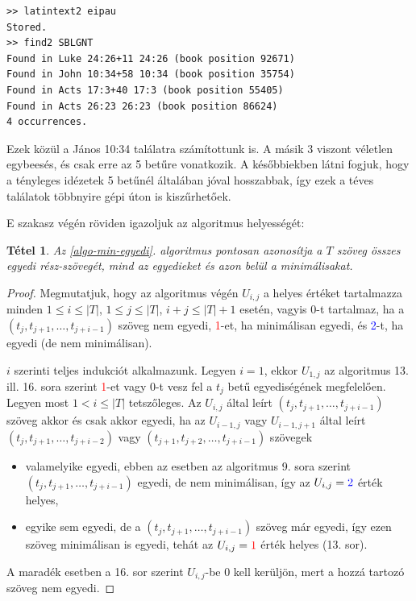 \documentclass{article}
\newtheorem{theorem}{Tétel}
\begin{document}
\begin{lstlisting}
>> latintext2 eipau
Stored.
>> find2 SBLGNT 
Found in Luke 24:26+11 24:26 (book position 92671)
Found in John 10:34+58 10:34 (book position 35754)
Found in Acts 17:3+40 17:3 (book position 55405)
Found in Acts 26:23 26:23 (book position 86624)
4 occurrences.
\end{lstlisting}

Ezek közül a János 10:34 találatra számítottunk is. A másik 3 viszont véletlen egybeesés,
és csak erre az 5 betűre vonatkozik.
A későbbiekben látni fogjuk, hogy a tényleges idézetek 5 betűnél általában jóval hosszabbak,
így ezek a téves találatok többnyire gépi úton is kiszűrhetőek.

E szakasz végén röviden igazoljuk az algoritmus helyességét:
\begin{theorem}
Az \ref{algo-min-egyedi}. algoritmus pontosan azonosítja a $T$ szöveg összes egyedi rész-szövegét,
mind az egyedieket és azon belül a minimálisakat.
\end{theorem}
\begin{proof}
Megmutatjuk, hogy az algoritmus végén $U_{i,j}$ a helyes értéket
tartalmazza minden $1\leq i\leq |T|$, $1\leq j\leq |T|$, $i+j\leq |T|+1$ esetén,
vagyis 0-t tartalmaz, ha a $(t_j,t_{j+1},\ldots,t_{j+i-1})$ szöveg nem egyedi,
\textcolor{red}{1}-et, ha minimálisan egyedi, és \textcolor{blue}{2}-t, ha egyedi (de nem minimálisan).

$i$ szerinti teljes indukciót alkalmazunk. Legyen $i=1$, ekkor $U_{1,j}$ az algoritmus
13. ill. 16. sora szerint \textcolor{red}{1}-et vagy 0-t vesz fel a $t_j$ betű egyediségének
megfelelően. Legyen most $1<i\leq |T|$ tetszőleges. Az $U_{i,j}$ által leírt
$(t_j,t_{j+1},\ldots,t_{j+i-1})$ szöveg akkor és csak akkor
egyedi, ha az $U_{i-1,j}$ vagy $U_{i-1,j+1}$ által leírt
$(t_j,t_{j+1},\ldots,t_{j+i-2})$ vagy $(t_{j+1},t_{j+2},\ldots,t_{j+i-1})$
szövegek
\begin{itemize}
\item valamelyike egyedi, ebben az esetben az algoritmus 9. sora szerint
$(t_j,t_{j+1},\ldots,t_{j+i-1})$ egyedi, de nem minimálisan, így
az $U_{i,j}=\textcolor{blue}{2}$ érték helyes,
\item egyike sem egyedi, de a $(t_j,t_{j+1},\ldots,t_{j+i-1})$ szöveg már egyedi,
így ezen szöveg minimálisan is egyedi, tehát az $U_{i,j}=\textcolor{red}{1}$
érték helyes (13. sor).
\end{itemize}
A maradék esetben a 16. sor szerint $U_{i,j}$-be 0 kell kerüljön, mert a
hozzá tartozó szöveg nem egyedi.
\end{proof}
\end{document}
